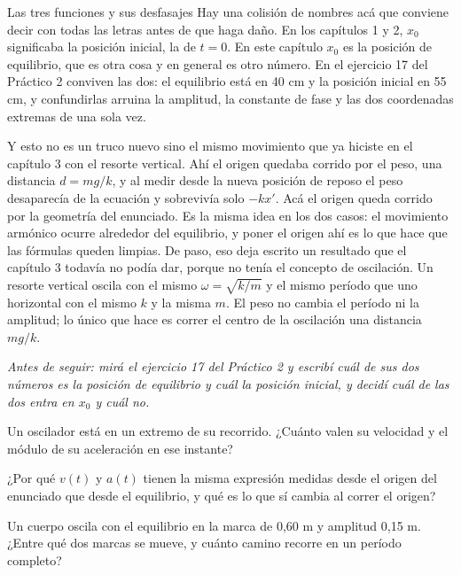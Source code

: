 \documentclass[11pt,openany]{book}
\begin{document}
\begin{bloque}{Las tres funciones y sus desfasajes}
Hay una colisión de nombres acá que conviene decir con todas las letras antes de que haga daño. En los capítulos 1 y 2, $x_0$ significaba la posición inicial, la de $t = 0$. En este capítulo $x_0$ es la posición de equilibrio, que es otra cosa y en general es otro número. En el ejercicio 17 del Práctico 2 conviven las dos: el equilibrio está en 40 cm y la posición inicial en 55 cm, y confundirlas arruina la amplitud, la constante de fase y las dos coordenadas extremas de una sola vez.

Y esto no es un truco nuevo sino el mismo movimiento que ya hiciste en el capítulo 3 con el resorte vertical. Ahí el origen quedaba corrido por el peso, una distancia $d = mg/k$, y al medir desde la nueva posición de reposo el peso desaparecía de la ecuación y sobrevivía solo $-kx'$. Acá el origen queda corrido por la geometría del enunciado. Es la misma idea en los dos casos: el movimiento armónico ocurre alrededor del equilibrio, y poner el origen ahí es lo que hace que las fórmulas queden limpias. De paso, eso deja escrito un resultado que el capítulo 3 todavía no podía dar, porque no tenía el concepto de oscilación. Un resorte vertical oscila con el mismo $\omega = \sqrt{k/m}$ y el mismo período que uno horizontal con el mismo $k$ y la misma $m$. El peso no cambia el período ni la amplitud; lo único que hace es correr el centro de la oscilación una distancia $mg/k$.

\textit{Antes de seguir: mirá el ejercicio 17 del Práctico 2 y escribí cuál de sus dos números es la posición de equilibrio y cuál la posición inicial, y decidí cuál de las dos entra en $x_0$ y cuál no.}
\end{bloque}

\begin{chequeo}
\item Un oscilador está en un extremo de su recorrido. ¿Cuánto valen su velocidad y el módulo de su aceleración en ese instante?
\item ¿Por qué $v(t)$ y $a(t)$ tienen la misma expresión medidas desde el origen del enunciado que desde el equilibrio, y qué es lo que sí cambia al correr el origen?
\item Un cuerpo oscila con el equilibrio en la marca de 0,60 m y amplitud 0,15 m. ¿Entre qué dos marcas se mueve, y cuánto camino recorre en un período completo?
\end{chequeo}
\end{document}
